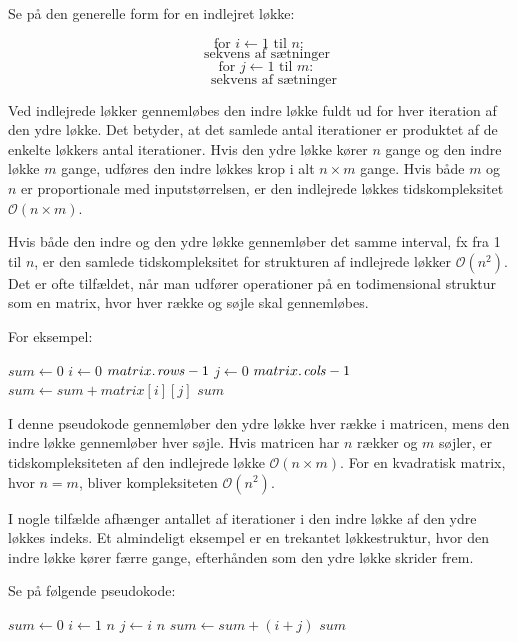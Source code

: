 Se på den generelle form for en indlejret løkke:

\newpage

\[
\text{for } i \gets 1 \text{ til } n:
\]
\[
\quad \text{sekvens af sætninger}
\]
\[
\quad \text{for } j \gets 1 \text{ til } m:
\]
\[
\quad\quad \text{sekvens af sætninger}
\]

Ved indlejrede løkker gennemløbes den indre løkke fuldt ud for hver iteration af den ydre løkke. Det betyder, at det samlede antal iterationer er produktet af de enkelte løkkers antal iterationer. Hvis den ydre løkke kører $n$ gange og den indre løkke $m$ gange, udføres den indre løkkes krop i alt $n \times m$ gange. Hvis både $m$ og $n$ er proportionale med inputstørrelsen, er den indlejrede løkkes tidskompleksitet $\mathcal{O}(n \times m)$. 

Hvis både den indre og den ydre løkke gennemløber det samme interval, fx fra 1 til $n$, er den samlede tidskompleksitet for strukturen af indlejrede løkker $\mathcal{O}(n^2)$. Det er ofte tilfældet, når man udfører operationer på en todimensional struktur som en matrix, hvor hver række og søjle skal gennemløbes.

For eksempel:

\begin{codebox}
    \li $sum \gets 0$
    \li \For $i \gets 0$ \To $\attrib{matrix}{rows} - 1$ \Do
    \li     \For $j \gets 0$ \To $\attrib{matrix}{cols} - 1$ \Do
    \li         $sum \gets sum + matrix[i][j]$
            \End
        \End
    \li \Return $sum$
\end{codebox}

I denne pseudokode gennemløber den ydre løkke hver række i matricen, mens den indre løkke gennemløber hver søjle. Hvis matricen har $n$ rækker og $m$ søjler, er tidskompleksiteten af den indlejrede løkke $\mathcal{O}(n \times m)$. For en kvadratisk matrix, hvor $n = m$, bliver kompleksiteten $\mathcal{O}(n^2)$.

I nogle tilfælde afhænger antallet af iterationer i den indre løkke af den ydre løkkes indeks. Et almindeligt eksempel er en trekantet løkkestruktur, hvor den indre løkke kører færre gange, efterhånden som den ydre løkke skrider frem.

Se på følgende pseudokode:

\begin{codebox}
    \li $sum \gets 0$
    \li \For $i \gets 1$ \To $n$ \Do
    \li     \For $j \gets i$ \To $n$ \Do
    \li         $sum \gets sum + (i + j)$
            \End
        \End
    \li \Return $sum$
\end{codebox}

